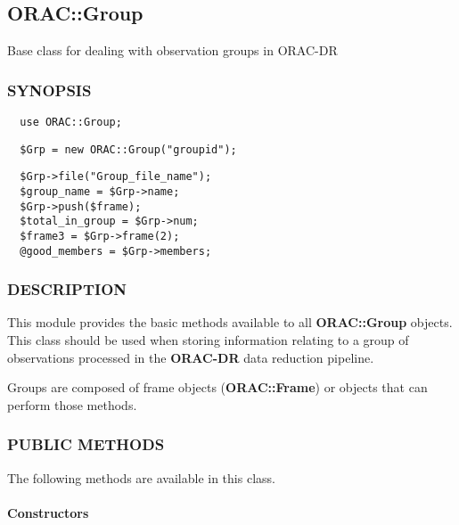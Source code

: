 \begin{description}
\subsection{ORAC::Group\label{ORAC::Group}}


Base class for dealing with observation groups in ORAC-DR

\subsubsection*{SYNOPSIS\label{ORAC::Group_SYNOPSIS}}
\begin{verbatim}
  use ORAC::Group;
\end{verbatim}
\begin{verbatim}
  $Grp = new ORAC::Group("groupid");
\end{verbatim}
\begin{verbatim}
  $Grp->file("Group_file_name");
  $group_name = $Grp->name;
  $Grp->push($frame);
  $total_in_group = $Grp->num;
  $frame3 = $Grp->frame(2);
  @good_members = $Grp->members;
\end{verbatim}
\subsubsection*{DESCRIPTION\label{ORAC::Group_DESCRIPTION}}


This module provides the basic methods available to all
\textbf{ORAC::Group} objects. This class should be used when
storing information relating to a group of observations
processed in the \textbf{ORAC-DR} data reduction pipeline.



Groups are composed of frame objects (\textbf{ORAC::Frame})
or objects that can perform those methods.

\subsubsection*{PUBLIC METHODS\label{ORAC::Group_PUBLIC_METHODS}}


The following methods are available in this class.

\paragraph*{Constructors\label{ORAC::Group_Constructors}}



\end{description}

